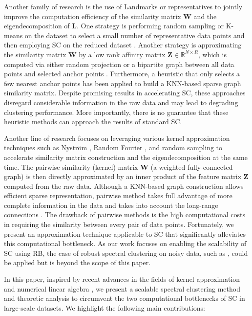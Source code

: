 \documentclass[sigconf]{acmart}
\newcommand{\R}{\mathbb{R}}
\newcommand{\1}{\boldsymbol{1}}
\newcommand{\bW}{\mathbf{W}}
\newcommand{\bL}{\mathbf{L}}
\newcommand{\bZ}{\mathbf{Z}}
\newcommand{\0}{\boldsymbol{0}}
\begin{document}
Another family of research is the use of Landmarks or representatives to jointly improve the computation efficiency of the similarity matrix $\bW$ and the eigendecomposition of $\bL$. One strategy is performing random sampling or K-means on the dataset to select a small number of representative data points and then employing SC on the reduced dataset \cite{yan2009fast,shinnou2008spectral}. Another strategy \cite{sakai2009fast,chen2011large,liu2013large,li2016scalable} is approximating the similarity matrix $\bW$ by a low rank affinity matrix $\bZ \in \R^{N \times R}$, which is computed via either random projection or a bipartite graph between all data points and selected anchor points \cite{liu2010large}. Furthermore, a heuristic that only selects a few nearest anchor points has been applied to build a KNN-based sparse graph similarity matrix. Despite promising results in accelerating SC, these approaches disregard considerable information in the raw data and may lead to degrading clustering performance. More importantly, there is no guarantee that these heuristic methods can approach the results of standard SC.

Another line of research \cite{fowlkes2004spectral,chitta2012efficient,chitta2011approximate,wu2018d2ke,wu2018random} focuses on leveraging various kernel approximation techniques such as Nystr{\"o}m  \cite{williams2001using}, Random Fourier \cite{rahimi2008random,wu2016revisiting,chen2016efficient}, and random sampling to accelerate similarity matrix construction and the eigendecomposition at the same time. The pairwise similarity (kernel) matrix $\bW$ (a weighted fully-connected graph) is then directly approximated by an inner product of the feature matrix $\bZ$ computed from the raw data. Although a KNN-based graph construction allows efficient sparse representation, pairwise method takes full advantage of more complete information in the data and takes into account the long-range connections \cite{fowlkes2004spectral,chen2011parallel}. The drawback of pairwise methods is the high computational costs in requiring the similarity between every pair of data points. Fortunately, we present an approximation technique applicable to SC that significantly alleviates this computational bottleneck. As our work focuses on enabling the scalability of SC using RB, the case of robust spectral clustering on noisy data, such as \cite{bojchevski2017robust}, 
could be applied but is beyond the scope of this paper.

In this paper, inspired by recent advances in the fields of kernel approximation and numerical linear algebra \cite{rahimi2008random,wu2016revisiting,wu2015preconditioned,wu2017primme_svds,chen2018incremental}, we present a scalable spectral clustering method and theoretic analysis to circumvent the two computational bottlenecks of SC in large-scale datasets. We highlight the following main contributions:
\end{document}
